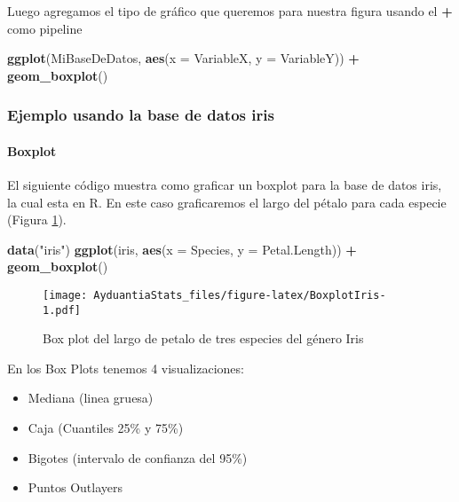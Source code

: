 \documentclass[]{book}
\newenvironment{Shaded}{\begin{snugshade}}{\end{snugshade}}
\newcommand{\DataTypeTok}[1]{\textcolor[rgb]{0.13,0.29,0.53}{#1}}
\newcommand{\KeywordTok}[1]{\textcolor[rgb]{0.13,0.29,0.53}{\textbf{#1}}}
\newcommand{\NormalTok}[1]{#1}
\newcommand{\OperatorTok}[1]{\textcolor[rgb]{0.81,0.36,0.00}{\textbf{#1}}}
\newcommand{\StringTok}[1]{\textcolor[rgb]{0.31,0.60,0.02}{#1}}
\providecommand{\tightlist}{%
  \setlength{\itemsep}{0pt}\setlength{\parskip}{0pt}}
\let\oldparagraph\paragraph
\renewcommand{\paragraph}[1]{\oldparagraph{#1}\mbox{}}
\begin{document}
Luego agregamos el tipo de gráfico que queremos para nuestra figura usando el \textbf{+} como pipeline

\begin{Shaded}
\begin{Highlighting}[]
\KeywordTok{ggplot}\NormalTok{(MiBaseDeDatos, }\KeywordTok{aes}\NormalTok{(}\DataTypeTok{x =}\NormalTok{ VariableX, }\DataTypeTok{y =}\NormalTok{ VariableY)) }\OperatorTok{+}\StringTok{ }\KeywordTok{geom_boxplot}\NormalTok{()}
\end{Highlighting}
\end{Shaded}

\hypertarget{ejemplo-usando-la-base-de-datos-iris}{%
\subsubsection{Ejemplo usando la base de datos iris}\label{ejemplo-usando-la-base-de-datos-iris}}

\hypertarget{boxplot}{%
\paragraph{Boxplot}\label{boxplot}}

El siguiente código muestra como graficar un boxplot para la base de datos iris, la cual esta en R. En este caso graficaremos el largo del pétalo para cada especie (Figura \ref{fig:BoxplotIris}).

\begin{Shaded}
\begin{Highlighting}[]
\KeywordTok{data}\NormalTok{(}\StringTok{"iris"}\NormalTok{)}
\KeywordTok{ggplot}\NormalTok{(iris, }\KeywordTok{aes}\NormalTok{(}\DataTypeTok{x =}\NormalTok{ Species, }\DataTypeTok{y =}\NormalTok{ Petal.Length)) }\OperatorTok{+}\StringTok{ }\KeywordTok{geom_boxplot}\NormalTok{()}
\end{Highlighting}
\end{Shaded}

\begin{figure}
\centering
\texttt{[image: AyduantiaStats\_files/figure-latex/BoxplotIris-1.pdf]}
\caption{\label{fig:BoxplotIris}Box plot del largo de petalo de tres especies del género Iris}
\end{figure}

En los Box Plots tenemos 4 visualizaciones:

\begin{itemize}
\tightlist
\item
  Mediana (linea gruesa)
\item
  Caja (Cuantiles 25\% y 75\%)
\item
  Bigotes (intervalo de confianza del 95\%)
\item
  Puntos Outlayers
\end{itemize}
\end{document}
